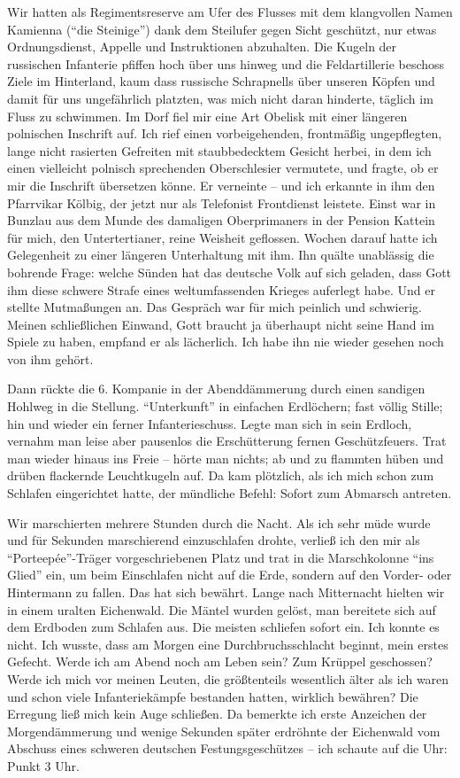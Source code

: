 \documentclass[a5paper,pagesize,10pt,twoside=true]{scrbook}
\begin{document}
Wir hatten als Regimentsreserve am Ufer des Flusses mit dem klangvollen Namen Kamienna (\enquote{die Steinige}) dank dem Steilufer gegen Sicht geschützt, nur etwas Ordnungsdienst, Appelle und Instruktionen abzuhalten. Die Kugeln der russischen Infanterie pfiffen hoch über uns hinweg und die Feldartillerie beschoss Ziele im Hinterland, kaum dass russische Schrapnells über unseren Köpfen und damit für uns ungefährlich platzten, was mich nicht daran hinderte, täglich im Fluss zu schwimmen. Im Dorf fiel mir eine Art Obelisk mit einer längeren polnischen Inschrift auf. Ich rief einen vorbeigehenden, frontmäßig ungepflegten, lange nicht rasierten Gefreiten mit staubbedecktem Gesicht herbei, in dem ich einen vielleicht polnisch sprechenden Oberschlesier vermutete, und fragte, ob er mir die Inschrift übersetzen könne. Er verneinte -- und ich erkannte in ihm den Pfarrvikar Kölbig, der jetzt nur als Telefonist Frontdienst leistete. Einst war in Bunzlau aus dem Munde des damaligen Oberprimaners in der Pension Kattein für mich, den Untertertianer, reine Weisheit geflossen. Wochen darauf hatte ich Gelegenheit zu einer längeren Unterhaltung mit ihm. Ihn quälte unablässig die bohrende Frage: welche Sünden hat das deutsche Volk auf sich geladen, dass Gott ihm diese schwere Strafe eines weltumfassenden Krieges auferlegt habe. Und er stellte Mutmaßungen an. Das Gespräch war für mich peinlich und schwierig. Meinen schließlichen Einwand, Gott braucht ja überhaupt nicht seine Hand im Spiele zu haben, empfand er als lächerlich. Ich habe ihn nie wieder gesehen noch von ihm gehört. 

Dann rückte die 6. Kompanie in der Abenddämmerung durch einen sandigen Hohlweg in die Stellung. \enquote{Unterkunft} in einfachen Erdlöchern; fast völlig Stille; hin und wieder ein ferner Infanterieschuss. Legte man sich in sein Erdloch, vernahm man leise aber pausenlos die Erschütterung fernen Geschützfeuers. Trat man wieder hinaus ins Freie -- hörte man nichts; ab und zu flammten hüben und drüben flackernde Leuchtkugeln auf. Da kam plötzlich, als ich mich schon zum Schlafen eingerichtet hatte, der mündliche Befehl: Sofort zum Abmarsch antreten.

Wir marschierten mehrere Stunden durch die Nacht. Als ich sehr müde wurde und für Sekunden marschierend einzuschlafen drohte, verließ ich den mir als \enquote{Porteepée}-Träger vorgeschriebenen Platz und trat in die Marschkolonne \enquote{ins Glied} ein, um beim Einschlafen nicht auf die Erde, sondern auf den Vorder- oder Hintermann zu fallen. Das hat sich bewährt. Lange nach Mitternacht hielten wir in einem uralten Eichenwald. Die Mäntel wurden gelöst, man bereitete sich auf dem Erdboden zum Schlafen aus. Die meisten schliefen sofort ein. Ich konnte es nicht. Ich wusste, dass am Morgen eine Durchbruchsschlacht beginnt, mein erstes Gefecht. Werde ich am Abend noch am Leben sein? Zum Krüppel geschossen? Werde ich mich vor meinen Leuten, die größtenteils wesentlich älter als ich waren und schon viele Infanteriekämpfe bestanden hatten, wirklich bewähren? Die Erregung ließ mich kein Auge schließen. Da bemerkte ich erste Anzeichen der Morgendämmerung und wenige Sekunden später erdröhnte der Eichenwald vom Abschuss eines schweren deutschen Festungsgeschützes -- ich schaute auf die Uhr: Punkt 3 Uhr.
\end{document}
